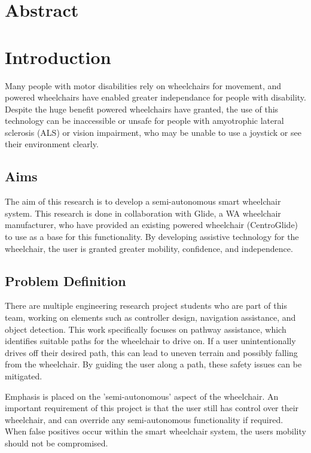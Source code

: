\documentclass[12pt]{article}
\begin{document}

\thispagestyle{empty}
\pagebreak

\section*{Abstract}
\pagebreak

\renewcommand{\contentsname}{Table of Contents}
\tableofcontents
\listoffigures
\listoftables
\pagebreak

\section{Introduction}
Many people with motor disabilities rely on wheelchairs for movement, and
powered wheelchairs have enabled greater independance for people with disability.
Despite the huge benefit powered wheelchairs have granted,
the use of this technology can be inaccessible or unsafe for people
with amyotrophic lateral sclerosis (ALS) or vision impairment,
who may be unable to use a joystick or see their environment clearly.

\subsection{Aims}
The aim of this research is to develop a semi-autonomous smart wheelchair system.
This research is done in collaboration with Glide, a WA wheelchair manufacturer,
who have provided an existing powered wheelchair (CentroGlide) to use as a base
for this functionality. By developing assistive technology for the wheelchair,
the user is granted greater mobility, confidence, and independence.

\subsection{Problem Definition}
There are multiple engineering research project students who are part of this team,
working on elements such as controller design, navigation assistance, and object detection.
This work specifically focuses on pathway assistance, which identifies suitable
paths for the wheelchair to drive on. If a user unintentionally drives off their desired path,
this can lead to uneven terrain and possibly falling from the wheelchair.
By guiding the user along a path, these safety issues can be mitigated.

Emphasis is placed on the 'semi-autonomous' aspect of the wheelchair.
An important requirement of this project is that the user still
has control over their wheelchair, and can override any semi-autonomous functionality
if required. When false positives occur within the smart wheelchair system,
the users mobility should not be compromised.
\end{document}
